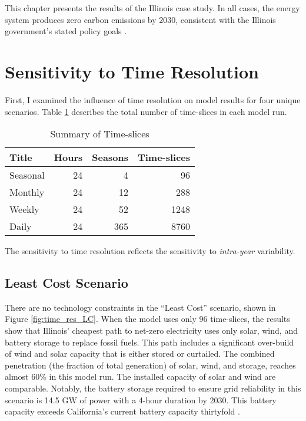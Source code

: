 This chapter presents the results of the Illinois case study. In all cases, the
energy system produces zero carbon emissions by 2030, consistent with the Illinois
government's stated policy goals
\cite{harmon_climate_2021,office_of_governor_jb_pritzker_gov_2021}.
\section{Sensitivity to Time Resolution}
\label{section:time_res}

First, I examined the influence of time resolution on model results for four
unique scenarios. Table \ref{tab:time-slices} describes the total number of
time-slices in each model run.

\begin{table}[H]
  \centering
  \caption{Summary of Time-slices}
  \label{tab:time-slices}
  \begin{tabular}{lrrr}
    \toprule
    Title & Hours & Seasons & Time-slices \\
    \midrule
    Seasonal & 24 & 4 & 96\\
    Monthly & 24 & 12 & 288\\
    Weekly & 24 & 52 & 1248\\
    Daily & 24 & 365 & 8760\\
    \bottomrule
  \end{tabular}
\end{table}
The sensitivity to time resolution reflects the sensitivity to \textit{intra-year}
variability.

\subsection{Least Cost Scenario}

There are no technology constraints in the ``Least Cost'' scenario, shown in Figure \ref{fig:time_res_LC}. When the model uses only 96 time-slices,
the results show that Illinois' cheapest path to net-zero electricity uses
only solar, wind, and battery storage to replace fossil fuels. This path includes
a significant over-build of wind and solar capacity that is either stored
or curtailed. The combined penetration (the fraction of total generation)
of solar, wind, and storage, reaches almost 60\% in this model run. The installed
capacity of solar and wind are comparable. Notably, the battery storage
required to ensure grid reliability in this scenario is 14.5 GW of power with
a 4-hour duration by 2030. This battery capacity exceeds California's current
battery capacity thirtyfold \cite{hutchins_us_2021}.

